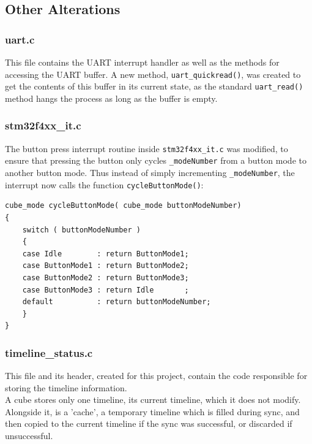 \subsection{Other Alterations}

\subsubsection{uart.c}

This file contains the UART interrupt handler as well as the methods for accessing the UART buffer. A new method, \texttt{uart\_quickread()}, was created to get the contents of this buffer in its current state, as the standard \texttt{uart\_read()} method hangs the process as long as the buffer is empty.

\subsubsection{stm32f4xx\_it.c}

The button press interrupt routine inside \texttt{stm32f4xx\_it.c} was modified, to ensure that pressing the button only cycles \texttt{\_modeNumber} from a button mode to another button mode. Thus instead of simply incrementing \texttt{\_modeNumber}, the interrupt now calls the function \texttt{cycleButtonMode()}:

\lstset{language=C,numbers=none}
\begin{lstlisting}[frame=lines]
cube_mode cycleButtonMode( cube_mode buttonModeNumber)
{
	switch ( buttonModeNumber )
	{
	case Idle		 : return ButtonMode1;
	case ButtonMode1 : return ButtonMode2;
	case ButtonMode2 : return ButtonMode3;
	case ButtonMode3 : return Idle       ;
	default 		 : return buttonModeNumber;
	}
}
\end{lstlisting}


\subsubsection{timeline\_status.c}

This file and its header, created for this project, contain the code responsible for storing the timeline information.\\

A cube stores only one timeline, its current timeline, which it does not modify. Alongside it, is a 'cache', a temporary timeline which is filled during sync, and then copied to the current timeline if the sync was successful, or discarded if unsuccessful.\\

